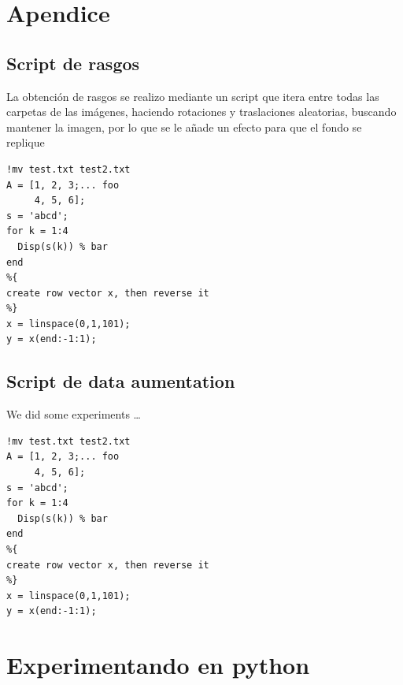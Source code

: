 \documentclass[a4paper, 11pt]{article}
\begin{document}
\section{Apendice}

\subsection{Script de rasgos}

La obtención de rasgos se realizo mediante un script que itera entre todas las carpetas de las imágenes, haciendo rotaciones y traslaciones aleatorias, buscando mantener la imagen, por lo que se le añade un efecto para que el fondo se replique


\begin{lstlisting}[style=Matlab-editor, caption=Script de rasgos]
%% Sample Matlab code
!mv test.txt test2.txt
A = [1, 2, 3;... foo
     4, 5, 6];
s = 'abcd';
for k = 1:4
  Disp(s(k)) % bar
end
%{
create row vector x, then reverse it
%}
x = linspace(0,1,101);
y = x(end:-1:1);
\end{lstlisting}


\subsection{Script de data aumentation}

We did some experiments \ldots

\begin{lstlisting}[style=Matlab-editor, caption=Python example]
%% Sample Matlab code
!mv test.txt test2.txt
A = [1, 2, 3;... foo
     4, 5, 6];
s = 'abcd';
for k = 1:4
  Disp(s(k)) % bar
end
%{
create row vector x, then reverse it
%}
x = linspace(0,1,101);
y = x(end:-1:1);
\end{lstlisting}

\pagebreak

\section{Experimentando en python}
\end{document}
